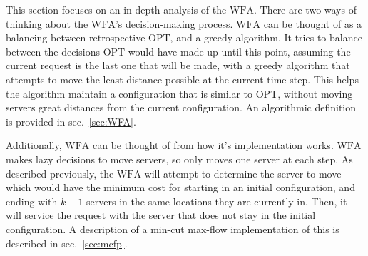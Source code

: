 This section focuses on an in-depth analysis of the $\mathrm{WFA}$. There are two ways of thinking about the $\mathrm{WFA}$'s decision-making process. $\mathrm{WFA}$ can be thought of as a balancing between retrospective-$\mathrm{OPT}$, and a greedy algorithm. It tries to balance between the decisions $\mathrm{OPT}$ would have made up until this point, assuming the current request is the last one that will be made, with a greedy algorithm that attempts to move the least distance possible at the current time step. This helps the algorithm maintain a configuration that is similar to $\mathrm{OPT}$, without moving servers great distances from the current configuration. An algorithmic definition is provided in sec.~\ref{sec:WFA}.

Additionally, $\mathrm{WFA}$ can be thought of from how it's implementation works. $\mathrm{WFA}$ makes lazy decisions to move servers, so only moves one server at each step. As described previously, the $\mathrm{WFA}$ will attempt to determine the server to move which would have the minimum cost for starting in an initial configuration, and ending with $k-1$ servers in the same locations they are currently in. Then, it will service the request with the server that does not stay in the initial configuration. A description of a min-cut max-flow implementation of this is described in sec.~\ref{sec:mcfp}.